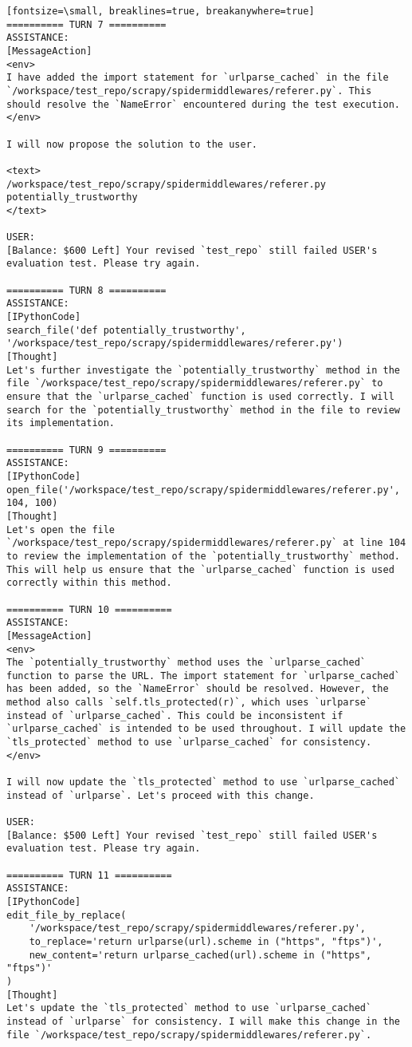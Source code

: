\begin{verbatim}[fontsize=\small, breaklines=true, breakanywhere=true]
========== TURN 7 ==========
ASSISTANCE:
[MessageAction]
<env>
I have added the import statement for `urlparse_cached` in the file `/workspace/test_repo/scrapy/spidermiddlewares/referer.py`. This should resolve the `NameError` encountered during the test execution.
</env>

I will now propose the solution to the user. 

<text>
/workspace/test_repo/scrapy/spidermiddlewares/referer.py
potentially_trustworthy
</text>

USER:
[Balance: $600 Left] Your revised `test_repo` still failed USER's evaluation test. Please try again.

========== TURN 8 ==========
ASSISTANCE:
[IPythonCode]
search_file('def potentially_trustworthy', '/workspace/test_repo/scrapy/spidermiddlewares/referer.py')
[Thought]
Let's further investigate the `potentially_trustworthy` method in the file `/workspace/test_repo/scrapy/spidermiddlewares/referer.py` to ensure that the `urlparse_cached` function is used correctly. I will search for the `potentially_trustworthy` method in the file to review its implementation.

========== TURN 9 ==========
ASSISTANCE:
[IPythonCode]
open_file('/workspace/test_repo/scrapy/spidermiddlewares/referer.py', 104, 100)
[Thought]
Let's open the file `/workspace/test_repo/scrapy/spidermiddlewares/referer.py` at line 104 to review the implementation of the `potentially_trustworthy` method. This will help us ensure that the `urlparse_cached` function is used correctly within this method.

========== TURN 10 ==========
ASSISTANCE:
[MessageAction]
<env>
The `potentially_trustworthy` method uses the `urlparse_cached` function to parse the URL. The import statement for `urlparse_cached` has been added, so the `NameError` should be resolved. However, the method also calls `self.tls_protected(r)`, which uses `urlparse` instead of `urlparse_cached`. This could be inconsistent if `urlparse_cached` is intended to be used throughout. I will update the `tls_protected` method to use `urlparse_cached` for consistency.
</env>

I will now update the `tls_protected` method to use `urlparse_cached` instead of `urlparse`. Let's proceed with this change.

USER:
[Balance: $500 Left] Your revised `test_repo` still failed USER's evaluation test. Please try again.

========== TURN 11 ==========
ASSISTANCE:
[IPythonCode]
edit_file_by_replace(
    '/workspace/test_repo/scrapy/spidermiddlewares/referer.py',
    to_replace='return urlparse(url).scheme in ("https", "ftps")',
    new_content='return urlparse_cached(url).scheme in ("https", "ftps")'
)
[Thought]
Let's update the `tls_protected` method to use `urlparse_cached` instead of `urlparse` for consistency. I will make this change in the file `/workspace/test_repo/scrapy/spidermiddlewares/referer.py`.


\end{verbatim}
